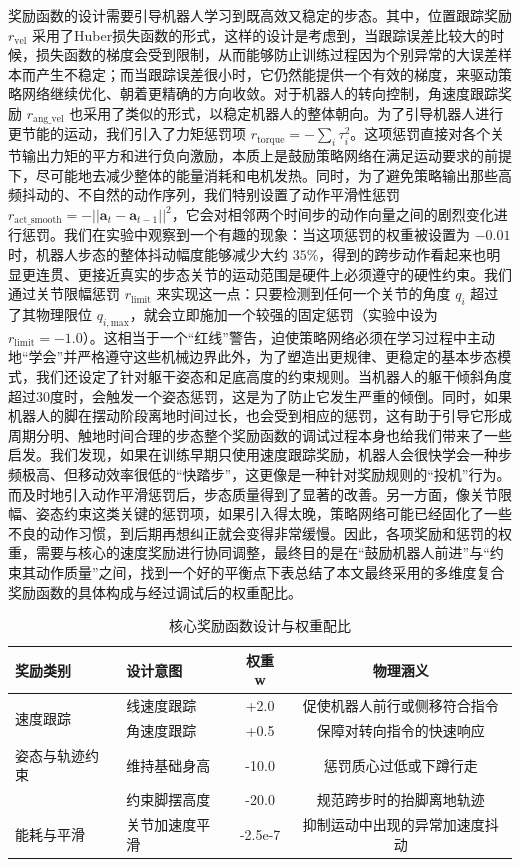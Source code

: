 奖励函数的设计需要引导机器人学习到既高效又稳定的步态。其中，位置跟踪奖励 $r_{\text{vel}}$ 采用了Huber损失函数的形式，这样的设计是考虑到，当跟踪误差比较大的时候，损失函数的梯度会受到限制，从而能够防止训练过程因为个别异常的大误差样本而产生不稳定；而当跟踪误差很小时，它仍然能提供一个有效的梯度，来驱动策略网络继续优化、朝着更精确的方向收敛。对于机器人的转向控制，角速度跟踪奖励 $r_{\text{ang\_vel}}$ 也采用了类似的形式，以稳定机器人的整体朝向。为了引导机器人进行更节能的运动，我们引入了力矩惩罚项 $r_{\text{torque}} = -\sum_i \tau_{i}^2$。这项惩罚直接对各个关节输出力矩的平方和进行负向激励，本质上是鼓励策略网络在满足运动要求的前提下，尽可能地去减少整体的能量消耗和电机发热。同时，为了避免策略输出那些高频抖动的、不自然的动作序列，我们特别设置了动作平滑性惩罚 $r_{\text{act\_smooth}} = -||\mathbf{a}_{t} - \mathbf{a}_{t-1}||^{2}$，它会对相邻两个时间步的动作向量之间的剧烈变化进行惩罚。我们在实验中观察到一个有趣的现象：当这项惩罚的权重被设置为 $-0.01$ 时，机器人步态的整体抖动幅度能够减少大约 $35\%$，得到的跨步动作看起来也明显更连贯、更接近真实的步态关节的运动范围是硬件上必须遵守的硬性约束。我们通过关节限幅惩罚 $r_{\text{limit}}$ 来实现这一点：只要检测到任何一个关节的角度 $q_i$ 超过了其物理限位 $q_{i, \text{max}}$，就会立即施加一个较强的固定惩罚（实验中设为 $r_{\text{limit}} = -1.0$）。这相当于一个“红线”警告，迫使策略网络必须在学习过程中主动地“学会”并严格遵守这些机械边界此外，为了塑造出更规律、更稳定的基本步态模式，我们还设定了针对躯干姿态和足底高度的约束规则。当机器人的躯干倾斜角度超过30度时，会触发一个姿态惩罚，这是为了防止它发生严重的倾倒。同时，如果机器人的脚在摆动阶段离地时间过长，也会受到相应的惩罚，这有助于引导它形成周期分明、触地时间合理的步态整个奖励函数的调试过程本身也给我们带来了一些启发。我们发现，如果在训练早期只使用速度跟踪奖励，机器人会很快学会一种步频极高、但移动效率很低的“快踏步”，这更像是一种针对奖励规则的“投机”行为。而及时地引入动作平滑惩罚后，步态质量得到了显著的改善。另一方面，像关节限幅、姿态约束这类关键的惩罚项，如果引入得太晚，策略网络可能已经固化了一些不良的动作习惯，到后期再想纠正就会变得非常缓慢。因此，各项奖励和惩罚的权重，需要与核心的速度奖励进行协同调整，最终目的是在“鼓励机器人前进”与“约束其动作质量”之间，找到一个好的平衡点下表总结了本文最终采用的多维度复合奖励函数的具体构成与经过调试后的权重配比。

\begin{table}[h]
\centering
\caption{核心奖励函数设计与权重配比}
\begin{tabular}{llcc}
\toprule
\textbf{奖励类别} & \textbf{设计意图} & \textbf{权重 w} & \textbf{物理涵义} \\
\midrule
\multirow{2}{*}{速度跟踪} & 线速度跟踪 & +2.0 & 促使机器人前行或侧移符合指令 \\
         & 角速度跟踪 & +0.5 & 保障对转向指令的快速响应 \\
\midrule
\multirow{1}{*}{姿态与轨迹约束} & 维持基础身高 & -10.0 & 惩罚质心过低或下蹲行走 \\
         & 约束脚摆高度 & -20.0 & 规范跨步时的抬脚离地轨迹 \\
\midrule
\multirow{1}{*}{能耗与平滑} & 关节加速度平滑 & -2.5e-7 & 抑制运动中出现的异常加速度抖动 \\
\bottomrule
\end{tabular}
\end{table}

